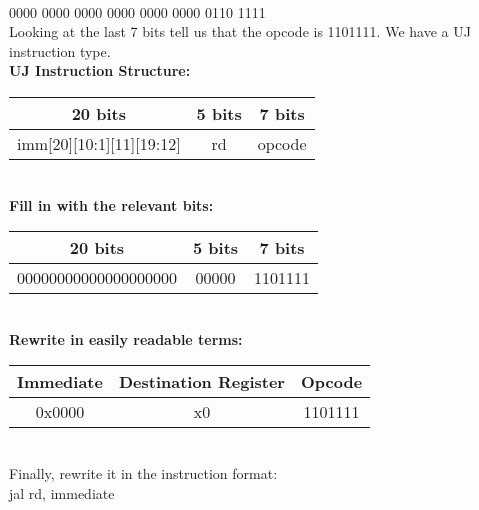 \documentclass[12pt]{article}
\begin{document}
	\begin{center}
		\vspace{0.3cm}\\
		0000 0000 0000 0000 0000 0000 0110 1111
		\vspace{0.3cm}\\
		Looking at the last 7 bits tell us that the opcode is 1101111. We have a UJ instruction type. \vspace{0.3cm}\\
		
		\textbf{UJ Instruction Structure:} \vspace{0.15cm}\\
		\begin{tabular}{ |c|c|c| } 
			\hline
			20 bits & 5 bits & 7 bits \\
			\hline
			imm[20][10:1][11][19:12] & rd & opcode \\
			\hline
		\end{tabular}
		\vspace{0.6cm} \\
		
		\textbf{Fill in with the relevant bits:} \vspace{0.15cm}\\
		\begin{tabular}{ |c|c|c| } 
			\hline
			20 bits & 5 bits & 7 bits \\
			\hline
			00000000000000000000 & 00000 & 1101111 \\
			\hline
		\end{tabular}
		\vspace{0.6cm} \\
		
		\textbf{Rewrite in easily readable terms:} \vspace{0.15cm}\\
		\begin{tabular}{ |c|c|c| } 
			\hline
			Immediate & Destination Register & Opcode \\
			\hline
			0x0000 & x0 & 1101111 \\
			\hline
		\end{tabular}
		\vspace{0.6cm} \\
		
		Finally, rewrite it in the instruction format: \\
		jal rd, immediate \vspace{0.6cm} \\

		
		
	\end{center}
	
\end{document}
